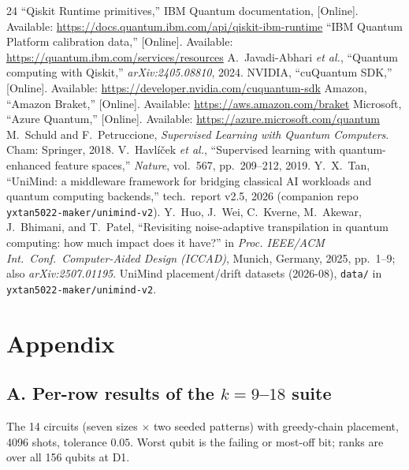 \documentclass[journal,10pt,twocolumn]{IEEEtran}
\begin{document}
\begin{thebibliography}{24}
 ``Qiskit Runtime primitives,'' IBM Quantum documentation, [Online]. Available: \url{https://docs.quantum.ibm.com/api/qiskit-ibm-runtime}
 ``IBM Quantum Platform calibration data,'' [Online]. Available: \url{https://quantum.ibm.com/services/resources}
 A.~Javadi-Abhari \emph{et al.}, ``Quantum computing with Qiskit,'' \emph{arXiv:2405.08810}, 2024.
 NVIDIA, ``cuQuantum SDK,'' [Online]. Available: \url{https://developer.nvidia.com/cuquantum-sdk}
 Amazon, ``Amazon Braket,'' [Online]. Available: \url{https://aws.amazon.com/braket}
 Microsoft, ``Azure Quantum,'' [Online]. Available: \url{https://azure.microsoft.com/quantum}
 M.~Schuld and F.~Petruccione, \emph{Supervised Learning with Quantum Computers}. Cham: Springer, 2018.
 V.~Havl\'i\v{c}ek \emph{et al.}, ``Supervised learning with quantum-enhanced feature spaces,'' \emph{Nature}, vol.~567, pp.~209--212, 2019.
 Y.~X.~Tan, ``UniMind: a middleware framework for bridging classical AI workloads and quantum computing backends,'' tech.\ report v2.5, 2026 (companion repo \texttt{yxtan5022-maker/unimind-v2}).
 Y.~Huo, J.~Wei, C.~Kverne, M.~Akewar, J.~Bhimani, and T.~Patel, ``Revisiting noise-adaptive transpilation in quantum computing: how much impact does it have?'' in \emph{Proc. IEEE/ACM Int.\ Conf.\ Computer-Aided Design (ICCAD)}, Munich, Germany, 2025, pp.~1--9; also \emph{arXiv:2507.01195}.
 UniMind placement/drift datasets (2026-08), \texttt{data/} in \texttt{yxtan5022-maker/unimind-v2}.
\end{thebibliography}

\newpage
\section*{Appendix}
\subsection*{A. Per-row results of the $k{=}9$--$18$ suite}
\label{app:krows}
The 14 circuits (seven sizes $\times$ two seeded patterns) with greedy-chain placement, 4096 shots, tolerance
$0.05$. Worst qubit is the failing or most-off bit; ranks are over all 156 qubits at D1.
\end{document}
